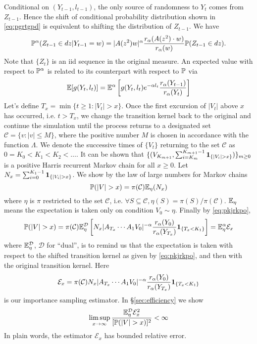 Conditional on $(Y_{t-1}, l_{t-1})$, the only source of randomness to
$Y_t$ comes from $Z_{t-1}$. Hence the shift of conditional probability
distribution shown in \eqref{eq:pgrtgpd} is equivalent to shifting the
distribution of $Z_{t-1}$. We have
\[
\P^\alpha (Z_{t-1} \in dz | Y_{t-1} = w) = |A(z^2) w|^\alpha {
  r_\alpha(A(z^2) \cdot w) \over r_\alpha(w)
} \P(Z_{t-1} \in dz).
\]
Note that $\{Z_t\}$ is an iid sequence in the original measure.
An expected value with respect to $\P^\alpha$ is related to its
counterpart with respect to $\P$ via
\begin{equation}
  \label{eq:pkjrkpo}
  \E [g(Y_t, l_t)] = \E^\alpha \left[
    g(Y_t, l_t) e^{-\alpha l_t} {r_\alpha(Y_{t-1}) \over r_\alpha(Y_t)}
    \right]
\end{equation}
Let's define $T_x = \min\{t \geq 1: |V_t| > x\}$. 
Once the first excursion of $|V_t|$ above $x$ has occurred, i.e.
$t > T_x$, we change the transition kernel back to the original and
continue the simulation until the process returns to a designated set
$\mathcal C = \{v: |v| \leq M\}$, where
the positive number $M$ is chosen in accordance with the function
$\Lambda$. We denote the successive times of $\{V_t\}$ returning to the
set $\mathcal C$ as $0 = K_0  < K_1 < K_2 < \ldots$. It can be shown that
$\{(V_{K_{m+1}}, \sum_{i=K_m}^{K_{m+1} - 1} \1{|V_i| > x})\}_{m \geq 0}$
is a positive Harris recurrent Markov chain for all $x \geq 0$.
Let $N_x = \sum_{i=0}^{K_1 - 1} \1{|V_i| > x}$. We show by the law of large
numbers for Markov chains
\[
\P(|V| > x) = \pi(\mathcal C) \E_\eta(N_x)
\]
where $\eta$ is $\pi$ restricted to the set $\mathcal C$, i.e.
$\forall S \subseteq \mathcal C, \eta(S) = \pi(S)/\pi(\mathcal C)$.
$\E_\eta$ means the expectation is taken only on condition
$V_0 \sim \eta$. Finally by \eqref{eq:pkjrkpo},
\[
\P(|V| > x) = \pi(\mathcal C) \E_\eta^{\mathcal D} \left[
  N_x |A_{T_x} \cdots A_1 V_0|^{-\alpha}
  {r_\alpha(Y_0) \over r_\alpha(Y_{T_x})}
  \1{T_x < K_1}
  \right]
  =
  \E_\eta^{\alpha} \mathcal E_x
\]
where $\E_\eta^{\mathcal D}$, $\mathcal D$ for ``dual'', is to remind us
that the expectation is taken with respect to the shifted transition kernel
as given by \eqref{eq:pkjrkpo}, and then with the original transition kernel.
Here
\[
\mathcal E_x
=
\pi(\mathcal C)
N_x |A_{T_x} \cdots A_1 V_0|^{-\alpha}
{r_\alpha(Y_0) \over r_\alpha(Y_{T_x})}
\1{T_x < K_1}
\]
is our importance sampling estimator. In \S\ref{sec:efficiency} we show
\[
\limsup_{x \to \infty} {
  \E_\eta^{\mathcal D} \mathcal E_x^2
  \over
  [\P(|V| > x)]^2
} < \infty
\]
In plain words, the estimator $\mathcal E_x$ has bounded relative error.

